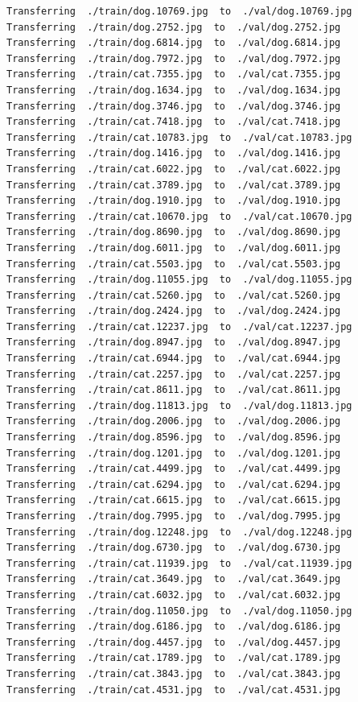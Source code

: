 \documentclass[]{book}
\theoremstyle{definition}
\theoremstyle{definition}
\theoremstyle{definition}
\theoremstyle{remark}
\begin{document}
\begin{verbatim}
Transferring  ./train/dog.10769.jpg  to  ./val/dog.10769.jpg
Transferring  ./train/dog.2752.jpg  to  ./val/dog.2752.jpg
Transferring  ./train/dog.6814.jpg  to  ./val/dog.6814.jpg
Transferring  ./train/dog.7972.jpg  to  ./val/dog.7972.jpg
Transferring  ./train/cat.7355.jpg  to  ./val/cat.7355.jpg
Transferring  ./train/dog.1634.jpg  to  ./val/dog.1634.jpg
Transferring  ./train/dog.3746.jpg  to  ./val/dog.3746.jpg
Transferring  ./train/cat.7418.jpg  to  ./val/cat.7418.jpg
Transferring  ./train/cat.10783.jpg  to  ./val/cat.10783.jpg
Transferring  ./train/dog.1416.jpg  to  ./val/dog.1416.jpg
Transferring  ./train/cat.6022.jpg  to  ./val/cat.6022.jpg
Transferring  ./train/cat.3789.jpg  to  ./val/cat.3789.jpg
Transferring  ./train/dog.1910.jpg  to  ./val/dog.1910.jpg
Transferring  ./train/cat.10670.jpg  to  ./val/cat.10670.jpg
Transferring  ./train/dog.8690.jpg  to  ./val/dog.8690.jpg
Transferring  ./train/dog.6011.jpg  to  ./val/dog.6011.jpg
Transferring  ./train/cat.5503.jpg  to  ./val/cat.5503.jpg
Transferring  ./train/dog.11055.jpg  to  ./val/dog.11055.jpg
Transferring  ./train/cat.5260.jpg  to  ./val/cat.5260.jpg
Transferring  ./train/dog.2424.jpg  to  ./val/dog.2424.jpg
Transferring  ./train/cat.12237.jpg  to  ./val/cat.12237.jpg
Transferring  ./train/dog.8947.jpg  to  ./val/dog.8947.jpg
Transferring  ./train/cat.6944.jpg  to  ./val/cat.6944.jpg
Transferring  ./train/cat.2257.jpg  to  ./val/cat.2257.jpg
Transferring  ./train/cat.8611.jpg  to  ./val/cat.8611.jpg
Transferring  ./train/dog.11813.jpg  to  ./val/dog.11813.jpg
Transferring  ./train/dog.2006.jpg  to  ./val/dog.2006.jpg
Transferring  ./train/dog.8596.jpg  to  ./val/dog.8596.jpg
Transferring  ./train/dog.1201.jpg  to  ./val/dog.1201.jpg
Transferring  ./train/cat.4499.jpg  to  ./val/cat.4499.jpg
Transferring  ./train/cat.6294.jpg  to  ./val/cat.6294.jpg
Transferring  ./train/cat.6615.jpg  to  ./val/cat.6615.jpg
Transferring  ./train/dog.7995.jpg  to  ./val/dog.7995.jpg
Transferring  ./train/dog.12248.jpg  to  ./val/dog.12248.jpg
Transferring  ./train/dog.6730.jpg  to  ./val/dog.6730.jpg
Transferring  ./train/cat.11939.jpg  to  ./val/cat.11939.jpg
Transferring  ./train/cat.3649.jpg  to  ./val/cat.3649.jpg
Transferring  ./train/cat.6032.jpg  to  ./val/cat.6032.jpg
Transferring  ./train/dog.11050.jpg  to  ./val/dog.11050.jpg
Transferring  ./train/dog.6186.jpg  to  ./val/dog.6186.jpg
Transferring  ./train/dog.4457.jpg  to  ./val/dog.4457.jpg
Transferring  ./train/cat.1789.jpg  to  ./val/cat.1789.jpg
Transferring  ./train/cat.3843.jpg  to  ./val/cat.3843.jpg
Transferring  ./train/cat.4531.jpg  to  ./val/cat.4531.jpg

\end{verbatim}
\end{document}
